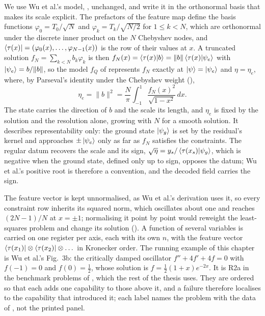 We use Wu et al.'s model, , unchanged, and write it in the orthonormal basis that makes its scale explicit. The prefactors of the feature map define the basis functions $\varphi_0=T_0/\sqrt{N}$ and $\varphi_k=T_k/\sqrt{N/2}$ for $1\le k<N$, which are orthonormal under the discrete inner product on the $N$ Chebyshev nodes, and $\bra{\tau(x)}=(\varphi_0(x),\dots,\varphi_{N-1}(x))$ is the row of their values at $x$. A truncated solution $f_N=\sum_{k<N}b_k\varphi_k$ is then $f_N(x)=\braket{\tau(x)|b}=\|b\|\braket{\tau(x)|\psi_e}$ with $\ket{\psi_e}=b/\|b\|$, so the model $f_Q$ of  represents $f_N$ exactly at $\ket{\psi}=\ket{\psi_e}$ and $\eta=\eta_e$, where, by Parseval's identity under the Chebyshev weight (),
\begin{equation}
    \eta_e=\|b\|^2=\frac{N}{\pi}\int_{-1}^{1}\frac{f_N(x)^2}{\sqrt{1-x^2}}\,dx .
    \label{eq:eta-e}
\end{equation}
The state carries the direction of $b$ and the scale its length, and $\eta_e$ is fixed by the solution and the resolution alone, growing with $N$ for a smooth solution. It describes representability only: the ground state $\ket{\psi_g}$ is set by the residual's kernel and approaches $\pm\ket{\psi_e}$ only as far as $f_N$ satisfies the constraints. The regular datum recovers the scale and its sign, $\sqrt\eta=y_s/\braket{\tau(x_s)|\psi_g}$, which is negative when the ground state, defined only up to sign, opposes the datum; Wu et al.'s positive root is therefore a convention, and the decoded field carries the sign.

The feature vector is kept unnormalised, as Wu et al.'s derivation uses it, so every constraint row inherits its squared norm, which oscillates about one and reaches $(2N-1)/N$ at $x=\pm1$; normalising it point by point would reweight the least-squares problem and change its solution (). A function of several variables is carried on one register per axis, each with its own $n$, with the feature vector $\bra{\tau(x_1)}\otimes\bra{\tau(x_2)}\otimes\dots$ in Kronecker order. The running example of this chapter is Wu et al.'s Fig.~3b: the critically damped oscillator $f''+4f'+4f=0$ with $f(-1)=0$ and $f(0)=\tfrac12$, whose solution is $f=\tfrac12(1+x)e^{-2x}$. It is R2a in the benchmark problems of , which the rest of the thesis uses. They are ordered so that each adds one capability to those above it, and a failure therefore localises to the capability that introduced it; each label names the problem with the data of , not the printed panel.

